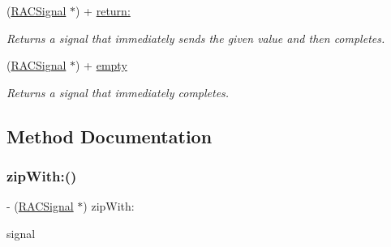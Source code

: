 \begin{DoxyCompactItemize}
\mbox{\label{category_r_a_c_signal_07_r_a_c_stream_08_a41b2f3cea45bb3a14911299cb572b7d9}} 
(\mbox{\hyperlink{interface_r_a_c_signal}{R\+A\+C\+Signal}} $\ast$) + \mbox{\hyperlink{category_r_a_c_signal_07_r_a_c_stream_08_a41b2f3cea45bb3a14911299cb572b7d9}{return\+:}}
\begin{DoxyCompactList}\small\item\em Returns a signal that immediately sends the given value and then completes. \end{DoxyCompactList}\item 
\mbox{\label{category_r_a_c_signal_07_r_a_c_stream_08_a7905f73a3de844e28a19d9d63cd37214}} 
(\mbox{\hyperlink{interface_r_a_c_signal}{R\+A\+C\+Signal}} $\ast$) + \mbox{\hyperlink{category_r_a_c_signal_07_r_a_c_stream_08_a7905f73a3de844e28a19d9d63cd37214}{empty}}
\begin{DoxyCompactList}\small\item\em Returns a signal that immediately completes. \end{DoxyCompactList}\end{DoxyCompactItemize}


\subsection{Method Documentation}
\mbox{\label{category_r_a_c_signal_07_r_a_c_stream_08_ac822f657df311327de76bc55bcae689d}} 
\subsubsection{\texorpdfstring{zip\+With\+:()}{zipWith:()}\hspace{0.1cm}{\footnotesize\ttfamily [1/3]}}
{\footnotesize\ttfamily -\/ (\mbox{\hyperlink{interface_r_a_c_signal}{R\+A\+C\+Signal}} $\ast$) zip\+With\+: \begin{DoxyParamCaption}\item[{(\mbox{\hyperlink{interface_r_a_c_signal}{R\+A\+C\+Signal}} $\ast$)}]{signal }\end{DoxyParamCaption}}

